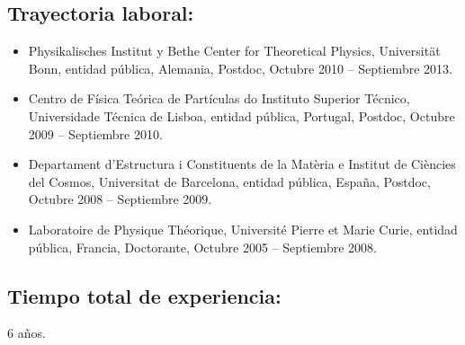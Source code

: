 \subsection{Trayectoria laboral:}
\begin{itemize}
\item Physikalisches Institut y Bethe Center for Theoretical Physics, Universität Bonn, entidad pública, Alemania, Postdoc, Octubre 2010 -- Septiembre 2013.
\item Centro de Física Teórica de Partículas do Instituto Superior Técnico, Universidade Técnica de Lisboa, entidad pública, Portugal, Postdoc, Octubre 2009 -- Septiembre 2010.
\item Departament d'Estructura i Constituents de la Matèria e Institut de Ciències del Cosmos, Universitat de Barcelona, entidad pública, España, Postdoc, Octubre 2008 -- Septiembre 2009.
\item Laboratoire de Physique Théorique, Université Pierre et Marie Curie, entidad pública, Francia, Doctorante, Octubre 2005 -- Septiembre 2008.
\end{itemize}
\subsection{Tiempo total de experiencia:}
6 años.


